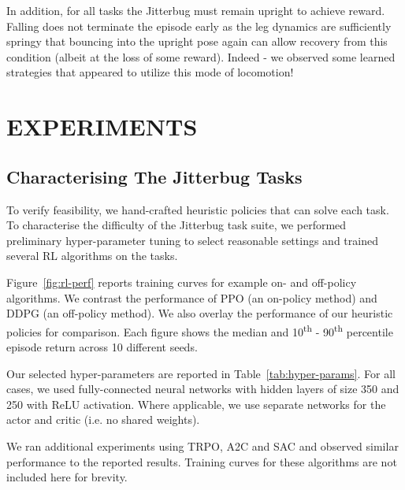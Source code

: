 \documentclass[letterpaper, 10 pt, conference]{ieeeconf}
\begin{document}
In addition, for all tasks the Jitterbug must remain upright to achieve reward.
Falling does not terminate the episode early as the leg dynamics are sufficiently springy that bouncing into the upright pose again can allow recovery from this condition (albeit at the loss of some reward).
Indeed - we observed some learned strategies that appeared to utilize this mode of locomotion!

\section{EXPERIMENTS}

\subsection{Characterising The Jitterbug Tasks}

To verify feasibility, we hand-crafted heuristic policies that can solve each task.
To characterise the difficulty of the Jitterbug task suite, we performed preliminary hyper-parameter tuning to select reasonable settings and trained several RL algorithms on the tasks.

Figure~\ref{fig:rl-perf} reports training curves for example on- and off-policy algorithms.
We contrast the performance of PPO (an on-policy method) and DDPG (an off-policy method).
We also overlay the performance of our heuristic policies for comparison.
Each figure shows the median and 10\textsuperscript{th} - 90\textsuperscript{th} percentile episode return across 10 different seeds.

Our selected hyper-parameters are reported in Table~\ref{tab:hyper-params}.
For all cases, we used fully-connected neural networks with hidden layers of size 350 and 250 with ReLU activation.
Where applicable, we use separate networks for the actor and critic (i.e. no shared weights).

We ran additional experiments using TRPO, A2C and SAC and observed similar performance to the reported results.
Training curves for these algorithms are not included here for brevity.
\end{document}
